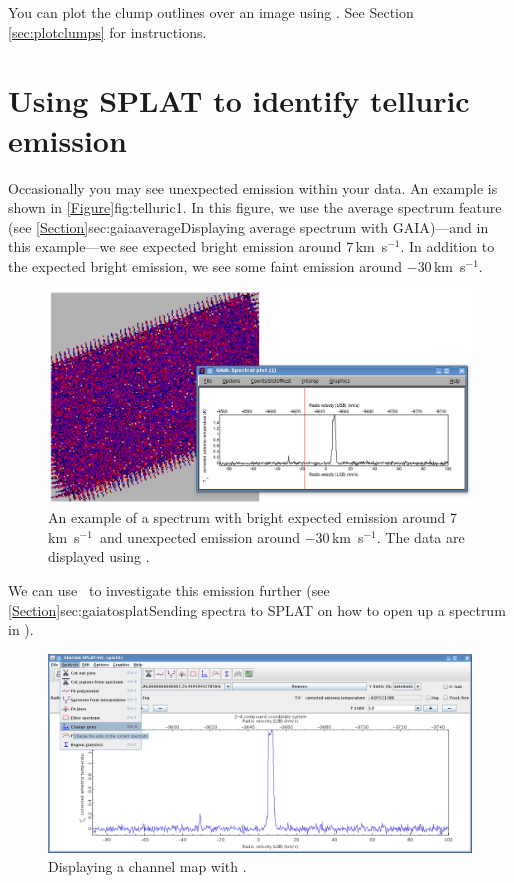 \documentclass[11pt,oneside,chapters]{starlink}
\newcommand{\kms}{\mbox{$\,$km~s$^{-1}$}}   %
\newcommand{\kms}{\,km~s$^{-1}$}   %
\begin{document}
You can plot the clump outlines over an image using \gaia. See Section
\ref{sec:plotclumps} for instructions.



\section{Using SPLAT to identify telluric emission}
\label{sec:telluricsplat}

Occasionally you may see unexpected emission within your data. An
example is shown in \cref{Figure}{fig:telluric1}{}. In this figure, we
use the average spectrum feature (see
\cref{Section}{sec:gaiaaverage}{Displaying average spectrum with
GAIA})---and in this example---we see expected bright emission around
7\kms. In addition to the expected bright emission, we see some faint
emission around $-$30\kms.

\begin{figure}[h!]
\begin{center}
\includegraphics[width=0.7\linewidth]{sc20_splat_spectrum_example_telluric1.png}
\caption[An example of unexpected emission seen in \gaia.]{\label{fig:telluric1}
  An example of a spectrum with bright expected emission around 7\kms\ and
  unexpected emission around $-$30\kms. The data are displayed using \gaia.}
\end{center}
\end{figure}

We can use \splat\ to investigate this emission further (see
\cref{Section}{sec:gaiatosplat}{Sending spectra to SPLAT} on how to
open up a spectrum in \splat).

\begin{figure}[h!]
\begin{center}
\includegraphics[width=0.7\linewidth]{sc20_splat_spectrum_example_telluric2.png}
\caption[blah]{\label{fig:telluric2}
  Displaying a channel map with \splat.}
\end{center}
\end{figure}
\end{document}
